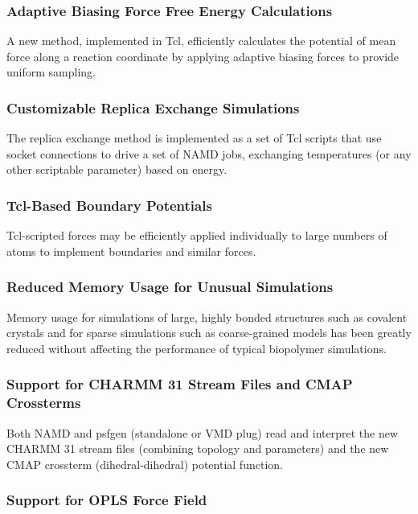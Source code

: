 \subsubsection*{Adaptive Biasing Force Free Energy Calculations}

A new method, implemented in Tcl, efficiently calculates the
potential of mean force along a reaction coordinate by applying
adaptive biasing forces to provide uniform sampling.

\subsubsection*{Customizable Replica Exchange Simulations}

The replica exchange method is implemented as a set of Tcl scripts
that use socket connections to drive a set of NAMD jobs, exchanging
temperatures (or any other scriptable parameter) based on energy.

\subsubsection*{Tcl-Based Boundary Potentials}

Tcl-scripted forces may be efficiently applied individually to
large numbers of atoms to implement boundaries and similar forces.

\subsubsection*{Reduced Memory Usage for Unusual Simulations}

Memory usage for simulations of large, highly bonded structures
such as covalent crystals and for sparse simulations such as
coarse-grained models has been greatly reduced without affecting
the performance of typical biopolymer simulations.

\subsubsection*{Support for CHARMM 31 Stream Files and CMAP Crossterms}

Both NAMD and psfgen (standalone or VMD plug) read and interpret
the new CHARMM 31 stream files (combining topology and parameters)
and the new CMAP crossterm (dihedral-dihedral) potential function.

\subsubsection*{Support for OPLS Force Field}

